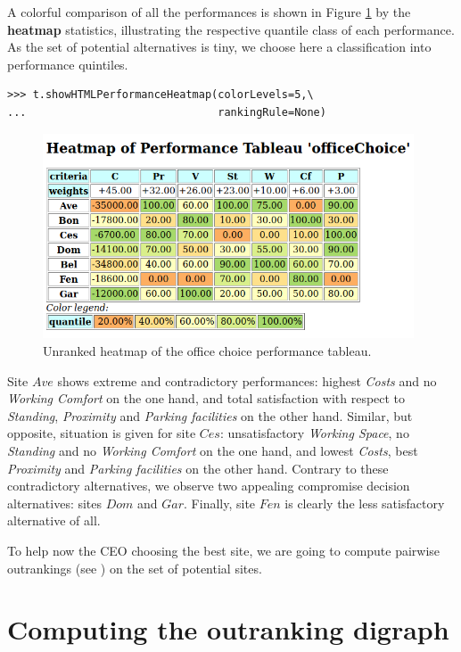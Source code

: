 A colorful comparison of all the performances is shown in Figure \ref{fig:6.1} by the \textbf{heatmap} statistics, illustrating the respective quantile class of each performance. As the set of potential alternatives is tiny, we choose here a classification into performance quintiles.

\begin{lstlisting}
>>> t.showHTMLPerformanceHeatmap(colorLevels=5,\
...                              rankingRule=None)
\end{lstlisting}
    
\begin{figure}[h]
\includegraphics[width=11cm]{Figures/officeChoiceHeatmap.png}
\caption{Unranked heatmap of the office choice performance tableau.}
\label{fig:6.1}       %
\end{figure}

Site $Ave$ shows extreme and contradictory performances: highest \emph{Costs} and no \emph{Working Comfort} on the one hand, and total satisfaction with respect to \emph{Standing}, \emph{Proximity} and \emph{Parking facilities} on the other hand. Similar, but opposite, situation is given for site $Ces$: unsatisfactory \emph{Working Space}, no \emph{Standing} and no \emph{Working Comfort} on the one hand, and lowest \emph{Costs}, best \emph{Proximity} and \emph{Parking facilities} on the other hand. Contrary to these contradictory alternatives, we observe two appealing compromise decision alternatives: sites $Dom$ and $Gar$. Finally, site $Fen$ is clearly the less satisfactory alternative of all.

To help now the CEO choosing the best site, we are going to compute pairwise outrankings (see \citet{BIS-2013}) on the set of potential sites.


\section{Computing the outranking digraph}
\label{sec:6.2}

